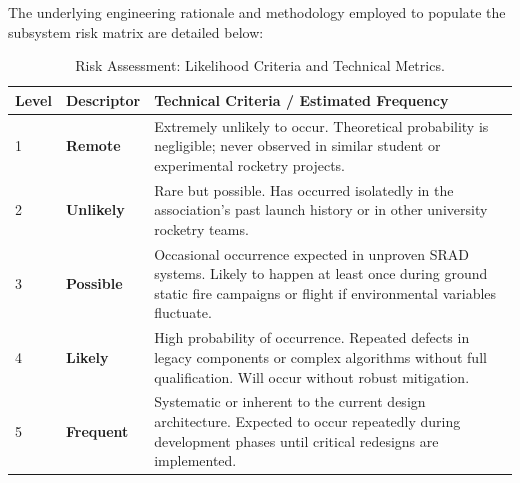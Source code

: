 \documentclass[11pt,a4paper]{article}
\begin{document}

The underlying engineering rationale and methodology employed to populate the subsystem risk matrix are detailed below:

\begin{table}[H]
    \centering
    \caption{Risk Assessment: Likelihood Criteria and Technical Metrics.}
    \label{tab:likelihood_criteria}
    \vspace{0.2cm}
    \begin{tabularx}{\textwidth}{|>{\centering\arraybackslash}m{1.5cm}|>{\centering\arraybackslash}m{2.5cm}|X|}
        \hline
        \rowcolor{EtseNavy}
        \textbf{\color{white}Level} & \textbf{\color{white}Descriptor} & \textbf{\color{white}Technical Criteria / Estimated Frequency} \\ \hline
        \cellcolor{RiskGreen}1 & \textbf{Remote} & Extremely unlikely to occur. Theoretical probability is negligible; never observed in similar student or experimental rocketry projects. \\ \hline
        \cellcolor{RiskGreen}2 & \textbf{Unlikely} & Rare but possible. Has occurred isolatedly in the association's past launch history or in other university rocketry teams. \\ \hline
        \cellcolor{RiskYellow}3 & \textbf{Possible} & Occasional occurrence expected in unproven SRAD systems. Likely to happen at least once during ground static fire campaigns or flight if environmental variables fluctuate. \\ \hline
        \cellcolor{RiskOrange}4 & \textbf{Likely} & High probability of occurrence. Repeated defects in legacy components or complex algorithms without full qualification. Will occur without robust mitigation. \\ \hline
        \cellcolor{RiskRed}5 & \textbf{Frequent} & Systematic or inherent to the current design architecture. Expected to occur repeatedly during development phases until critical redesigns are implemented. \\ \hline
    \end{tabularx}
\end{table}
\end{document}

